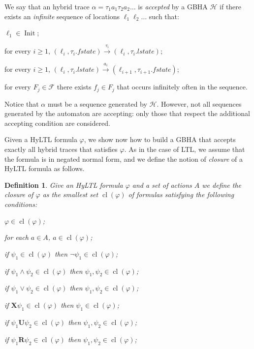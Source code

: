 \documentclass[submission,copyright,creativecommons]{eptcs}
\newcommand{\hyltl}{\textsf{HyLTL}\xspace}
\newcommand{\ltl}{\textsf{LTL}\xspace}
\newcommand{\X}{\ensuremath{\mathbin{\mathbf{X}}}\xspace}
\newcommand{\U}{\ensuremath{\mathbin{\mathbf{U}}}\xspace}
\newcommand{\R}{\ensuremath{\mathbin{\mathbf{R}}}\xspace}
\DeclareMathOperator{\cl}{cl}
\newtheorem{definition}{Definition}
\newcommand{\cvF}{\mathcal{F}}
\newcommand{\autH}{\mathcal{H}}
\DeclareMathOperator{\Init}{{Init}}
\newcommand{\fstate}{\mathit{fstate}}
\newcommand{\lstate}{\mathit{lstate}}
\newcommand{\trans}[1]{\xrightarrow{#1}}
\begin{document}
We say that an hybrid trace $\alpha = \tau_1 a_1 \tau_2 a_2 \ldots$ is \emph{accepted} by a GBHA $\autH$ if there exists an \emph{infinite} sequence of locations $\ell_1 \ell_2 \ldots$ such that:
\begin{compactenum}[(i)]
\item $\ell_1 \in \Init$;
\item for every $i \geq 1$, $(\ell_i,\tau_i.\fstate) \trans{\tau_i} (\ell_i,\tau_i.\lstate)$; 
\item for every $i \geq 1$, $(\ell_i,\tau_i.\lstate) \trans{a_i} (\ell_{i+1},\tau_{i+1}.\fstate)$;
\item for every $F_j \in \cvF$ there exists $f_j \in F_j$ that occurs infinitely often in the sequence.
\end{compactenum}

\noindent Notice that $\alpha$ must be a sequence generated by $\autH$. However, not all sequences generated by the automaton are accepting: only those that respect the additional accepting condition are considered.

Given a \hyltl formula $\varphi$, we show now how to build a GBHA that accepts exactly all hybrid traces that satisfies $\varphi$. As in the case of \ltl , we assume that the formula is in negated normal form, and we define the notion of \emph{closure} of a \hyltl formula as follows.

\setlength{\multicolsep}{0pt}

\begin{definition}\label{def:closure}
Give an \hyltl formula $\varphi$ and a set of actions $A$ we define the \emph{closure of $\varphi$} as the smallest set $\cl(\varphi)$ of formulas satisfying the following conditions:
\begin{multicols}{2}
\begin{compactitem}
	\item $\varphi \in \cl(\varphi)$;
	\item for each $a \in A$, $a \in \cl(\varphi)$;
	\item if $\psi_1 \in \cl(\varphi)$ then $\neg{\psi_1} \in \cl(\varphi)$;
	\item if $\psi_1 \land \psi_2 \in \cl(\varphi)$ then $\psi_1, \psi_2 \in \cl(\varphi)$;
	\item if $\psi_1 \lor \psi_2 \in \cl(\varphi)$ then $\psi_1, \psi_2 \in \cl(\varphi)$;
	\item if $\X \psi_1 \in \cl(\varphi)$ then $\psi_1 \in \cl(\varphi)$;
	\item if $\psi_1 \U \psi_2 \in \cl(\varphi)$ then $\psi_1, \psi_2 \in \cl(\varphi)$;
	\item if $\psi_1 \R \psi_2 \in \cl(\varphi)$ then $\psi_1, \psi_2 \in \cl(\varphi)$;
\end{compactitem}
\end{multicols}
\end{definition}
\end{document}
